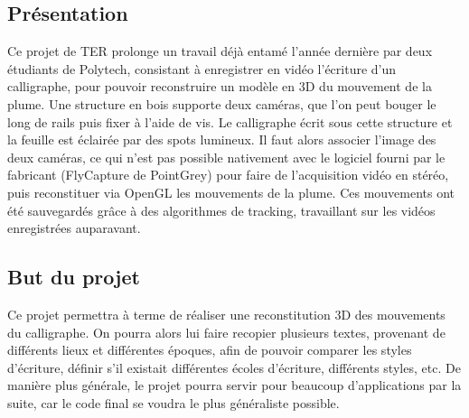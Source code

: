 \subsection{Présentation}

Ce projet de TER prolonge un travail déjà entamé l'année dernière par deux étudiants de Polytech, consistant à enregistrer en vidéo l'écriture d'un calligraphe, pour pouvoir reconstruire un modèle en 3D du mouvement de la plume. Une structure en bois supporte deux caméras, que l'on peut bouger le long de rails puis fixer à l'aide de vis. Le calligraphe écrit sous cette structure et la feuille est éclairée par des spots lumineux. Il faut alors associer l'image des deux caméras, ce qui n'est pas possible nativement avec le logiciel fourni par le fabricant (FlyCapture de PointGrey) pour faire de l'acquisition vidéo en stéréo, puis reconstituer via OpenGL les mouvements de la plume. Ces mouvements ont été sauvegardés grâce à des algorithmes de tracking, travaillant sur les vidéos enregistrées auparavant.

\subsection{But du projet}

Ce projet permettra à terme de réaliser une reconstitution 3D des mouvements du calligraphe. On pourra alors lui faire recopier plusieurs textes, provenant de différents lieux et différentes époques, afin de pouvoir comparer les styles d'écriture, définir s'il existait différentes écoles d'écriture, différents styles, etc. De manière plus générale, le projet pourra servir pour beaucoup d'applications par la suite, car le code final se voudra le plus généraliste possible.